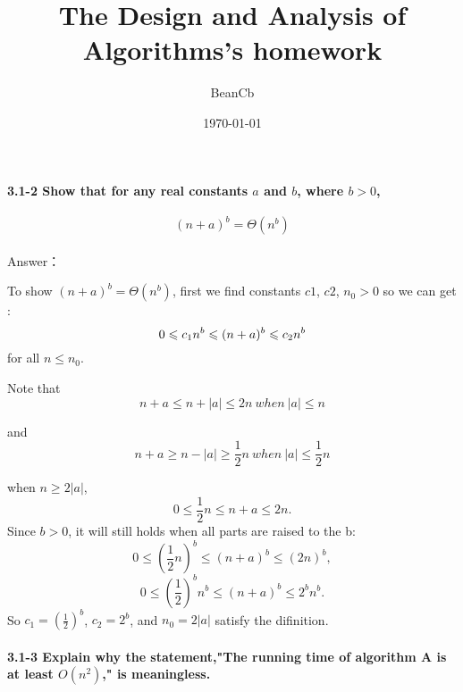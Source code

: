 \documentclass{ctexart}
\title{The Design and Analysis of Algorithms's homework}
\author{BeanCb}%
\date{\ukdate\today}
\begin{document}
		\maketitle
		\paragraph{3.1-2 Show that for any real constants $a$ and $b$, where $b > 0$,}
			\begin{equation}
				(n+a)^b=\Theta(n^b)\tag{3.2}
			\end{equation}
			\paragraph*{}
			Answer：

			To show $(n+a)^b=\Theta(n^b)$, first we find constants $c1$, $c2$, $n_0 > 0$ so we can get :
				\begin{equation}
					0\leqslant c_1n^b\leqslant (n+a)^b \leqslant c_2n^b\notag
				\end{equation}
				for all $n \leqslant n_0$.

				Note that
				\begin{equation}
					n + a \leqslant n + \left|a\right| \leqslant 2n\ when\ \left|a\right| \leqslant n\tag{3.2-1}
				\end{equation}

				and
				\begin{equation}
					n + a \geqslant n - \left|a\right| \geqslant \frac{1}{2}n\ when\ \left|a\right| \leqslant \frac{1}{2}n\tag{3.2-2}
				\end{equation}

				when $n \geqslant 2\left|a\right|$,
				\begin{equation}
					0 \leqslant \frac{1}{2}n \leqslant n + a \leqslant 2n.\tag{3.2-3}
				\end{equation}
				Since $b > 0$, it will still holds when all parts are raised to the b:
				\begin{equation}
					0 \leqslant (\frac{1}{2}n)^b \leqslant (n + a)^b \leqslant (2n)^b,\tag{3.2-4}
				\end{equation}
				\begin{equation}
					0 \leqslant (\frac{1}{2})^{b}n^b \leqslant (n + a)^b \leqslant 2^{b}n^b.\tag{3.2-5}
				\end{equation}
				So $c_1 = (\frac{1}{2})^b$, $c_2 = 2^b$, and $n_0 = 2\left|a\right|$ satisfy the difinition.
		\paragraph{3.1-3 Explain why the statement,"The running time of algorithm A is at least $O(n^2)$," is meaningless.}
\end{document}
